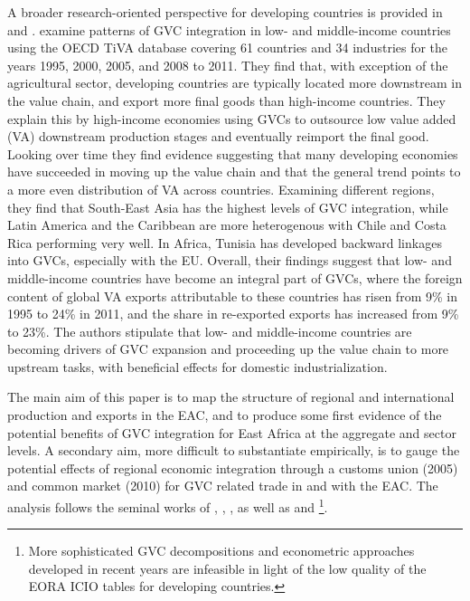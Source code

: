 \documentclass[a4paper]{article}
\begin{document}
A broader research-oriented perspective for developing countries is provided in \citet{Kummritz20162} and \citet{Kummritz20161}. \citet{Kummritz20162} examine patterns of GVC integration in low- and middle-income countries using the OECD TiVA database covering 61 countries and 34 industries for the years 1995, 2000, 2005, and 2008 to 2011. They find that, with exception of the agricultural sector, developing countries are typically located more downstream in the value chain, and export more final goods than high-income countries. They explain this by high-income economies using GVCs to outsource low value added (VA) downstream production stages and eventually reimport the final good. Looking over time they find evidence suggesting that many developing economies have succeeded in moving up the value chain and that the general trend points to a more even distribution of VA across countries. Examining different regions, they find that South-East Asia has the highest levels of GVC integration, while Latin America and the Caribbean are more heterogenous with Chile and Costa Rica performing very well. In Africa, Tunisia has developed backward linkages into GVCs, especially with the EU. Overall, their findings suggest that low- and middle-income countries have become an integral part of GVCs, where the foreign content of global VA exports attributable to these countries has risen from 9\% in 1995 to 24\% in 2011, and the share in re-exported exports has increased from 9\% to 23\%. The authors stipulate that low- and middle-income countries are becoming drivers of GVC expansion and proceeding up the value chain to more upstream tasks, with beneficial effects for domestic industrialization. \newline

The main aim of this paper is to map the structure of regional and international production and exports in the EAC, and to produce some first evidence of the potential benefits of GVC integration for East Africa at the aggregate and sector levels. A secondary aim, more difficult to substantiate empirically, is to gauge the potential effects of regional economic integration through a customs union (2005) and common market (2010) for GVC related trade in and with the EAC. The analysis follows the seminal works of \citet{hummels2001nature}, \citet{koopman2014tracing}, \citet{wang2013quantifying}, as well as \citet{Kummritz20161} and \citet{Kummritz20162}\footnote{More sophisticated GVC decompositions and econometric approaches developed in recent years are infeasible in light of the low quality of the EORA ICIO tables for developing countries.}. 
\end{document}
